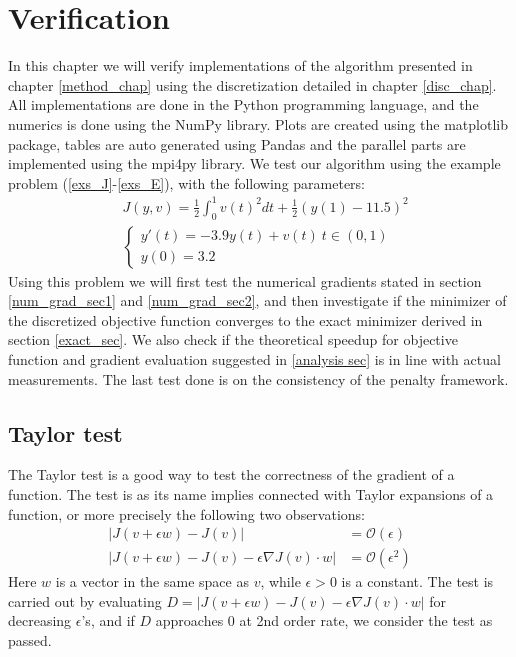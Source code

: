 \chapter{Verification}\label{Verification chapter}
In this chapter we will verify implementations of the algorithm presented in chapter \ref{method_chap} using the discretization detailed in chapter \ref{disc_chap}. All implementations are done in the Python programming language, and the numerics is done using the NumPy\cite{walt2011numpy} library. Plots are created using the matplotlib\cite{Hunter:2007} package, tables are auto generated using Pandas\cite{mckinney2010data} and the parallel parts are implemented using the mpi4py\cite{dalcin2007mpi4py} library. We test our algorithm using the example problem (\ref{exs_J}-\ref{exs_E}), with the following parameters:
\begin{align}
&J(y,v) = \frac{1}{2}\int_0^1v(t)^2dt + \frac{1}{2}(y(1)-11.5)^2 \label{test_J}\\
&\left\{
     \begin{array}{lr}
       	y'(t) = -3.9y(t)+v(t) \ t\in(0,1)\\
       	y(0)=3.2
     \end{array}
   \right. \label{test_E}
\end{align}
Using this problem we will first test the numerical gradients stated in section \ref{num_grad_sec1} and \ref{num_grad_sec2}, and then investigate if the minimizer of the discretized objective function converges to the exact minimizer derived in section \ref{exact_sec}. We also check if the theoretical speedup for objective function and gradient evaluation suggested in \ref{analysis sec} is in line with actual measurements. The last test done is on the consistency of the penalty framework. 
\section{Taylor test} \label{Taylor_sec}
The Taylor test is a good way to test the correctness of the gradient of a function. The test is as its name implies connected with Taylor expansions of a function, or more precisely the following two observations:
\begin{align*}
|J(v+\epsilon w)-J(v)| &= \mathcal{O}(\epsilon) \\
|J(v+\epsilon w)-J(v)-\epsilon\nabla J(v)\cdot w| &= \mathcal{O}(\epsilon^2)
\end{align*}
Here $w$ is a vector in the same space as $v$, while $\epsilon>0$ is a constant. The test is carried out by evaluating $D=|J(v+\epsilon w)-J(v)-\epsilon\nabla J(v)\cdot w|$ for decreasing $\epsilon$'s, and if $D$ approaches 0 at 2nd order rate, we consider the test as passed.
